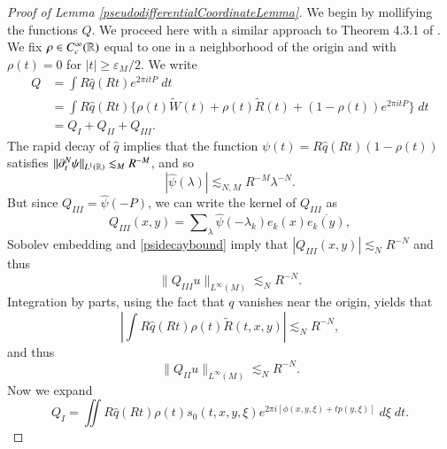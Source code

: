 \begin{proof} [Proof of Lemma \ref{pseudodifferentialCoordinateLemma}]
    We begin by mollifying the functions $Q$. We proceed here with a similar approach to Theorem 4.3.1 of \cite{Sogge}. We fix $\rho \in C_c^\infty(\operatorname{\mathbb{R}})$ equal to one in a neighborhood of the origin and with $\rho(t) = 0$ for $|t| \geq \varepsilon_M / 2$. We write
    \begin{equation}
    \begin{split}
        Q &= \int R \widehat{q}(R t) e^{2 \pi i t P}\; dt\\
        &= \int R \widehat{q}(Rt) \Big\{ \rho(t) \tilde{W}(t) + \rho(t) \tilde{R}(t) + (1 - \rho(t)) e^{2 \pi i t P} \Big\}\; dt\\
        &= Q_I + Q_{II} + Q_{III}.
    \end{split}
    \end{equation}
    The rapid decay of $\widehat{q}$ implies that the function $\psi(t) = R \widehat{q}(Rt) (1 - \rho(t))$ satisfies $\| \partial_t^N \psi \|_{L^1(\operatorname{\mathbb{R}})} \lesssim_M R^{-M}$, and so
    \begin{equation} \label{psidecaybound}
        |\widehat{\psi}(\lambda)| \lesssim_{N,M} R^{-M} \lambda^{-N}.
    \end{equation}
    But since $Q_{III} = \widehat{\psi}(-P)$, we can write the kernel of $Q_{III}$ as
    \begin{equation}
        Q_{III}(x,y) = \sum\nolimits_\lambda \widehat{\psi}(-\lambda_k) e_k(x) \overline{e_k(y)},
    \end{equation}
    Sobolev embedding and \eqref{psidecaybound} imply that $|Q_{III}(x,y)| \lesssim_N R^{-N}$ and thus
    \begin{equation} \label{QThreeBound}
        \| Q_{III} u \|_{L^\infty(M)} \lesssim_N R^{-N}.
    \end{equation}
    Integration by parts, using the fact that $q$ vanishes near the origin, yields that
    \begin{equation}
        \left| \int R \widehat{q}(Rt) \rho(t) \tilde{R}(t,x,y) \right| \lesssim_N R^{-N},
    \end{equation}
    and thus
    \begin{equation} \label{QTwoBound}
        \| Q_{II} u \|_{L^\infty(M)} \lesssim_N R^{-N}.
    \end{equation}
    Now we expand
    \begin{equation}
        Q_I = \iint R \widehat{q}(Rt) \rho(t) s_0(t,x,y,\xi) e^{2 \pi i [ \phi(x,y,\xi) + t p(y,\xi) ]}\; d\xi\; dt.
    \end{equation}

\end{proof}
